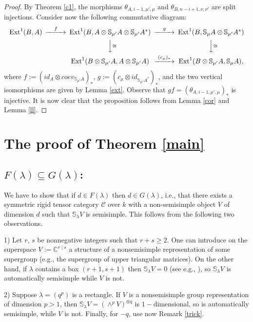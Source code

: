\documentclass{amsart}
\theoremstyle{definition}
\newcommand{\Ext}{\text{\rm Ext}^1}
\newcommand{\ot}{\otimes}
\newcommand{\C}{{\mathcal C}}
\begin{document}
\begin{proof}
By Theorem \ref{c1}, the morphisms $\theta_{A,i-1,\mu',\mu}$ and
$\theta_{B,n-i+1,\nu,\nu'}$ are split injections. Consider now the
following commutative diagram:
\begin{equation*}
\begin{CD} \Ext(B,A) @> f>> \Ext(B,A\ot \mathbb{S}_{\mu'}A\ot
\mathbb{S}_{\mu'}A^*) @> g>> \Ext(B,
\mathbb{S}_{\mu}A\ot \mathbb{S}_{\mu'}A^*) \\
@. @VV\cong V @VV\cong V \\
@. \Ext(B\ot \mathbb{S}_{\mu'}A,A\ot \mathbb{S}_{\mu'}A)
@>(c_{\mu}){_*}>> \Ext(B\ot \mathbb{S}_{\mu'}A, \mathbb{S}_{\mu}A),
\end{CD}
\end{equation*}
where $f:=(id_A\ot coev_{\mathbb{S}_{\mu'}A})_*$, $g:=(c_{\mu}\ot
id_{\mathbb{S}_{\mu'}A^*})_*$, and the two vertical isomorphisms are
given by Lemma \ref{ext}. Observe that
$gf=(\theta_{A,i-1,\mu',\mu})_*$ is injective. It is now clear that
the proposition follows from Lemma \ref{cor} and Lemma \ref{ll}.
\end{proof}

\section{The proof of Theorem \ref{main}}

\subsection{$F(\lambda)\subseteq G(\lambda)$:}
We have to show that if $d\in F(\lambda)$ then $d\in G(\lambda)$,
i.e., that there exists a symmetric rigid tensor category $\C$ over
$k$ with a non-semisimple object $V$ of dimension $d$ such that
$\mathbb{S}_{\lambda}V$ is semisimple. This follows from the
following two observations.

1) Let $r,\,s$ be nonnegative integers such that $r+s\ge 2$. One can
introduce on the superspace $V:=\mathbb{C}^{r\mid s}$ a structure of
a nonsemisimple representation of some supergroup (e.g., the
supergroup of upper triangular matrices). On the other hand, if
$\lambda$ contains a box $(r+1,s+1)$ then $\mathbb{S}_{\lambda}V=0$
(see e.g., \cite{d2}), so $\mathbb{S}_{\lambda}V$ is automatically
semisimple while $V$ is not.

2) Suppose $\lambda=(q^p)$ is a rectangle. If $V$ is a nonsemisimple
group representation of dimension $p>1$, then $\mathbb{S}_\lambda
V=(\wedge^{p}V) ^{\otimes q}$ is $1-$dimensional, so is
automatically semisimple, while $V$ is not. Finally, for $-q$, use
now Remark \ref{trick}.
\end{document}
